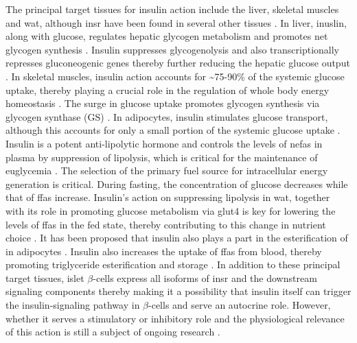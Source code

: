 
The principal target tissues for insulin action include the liver, skeletal muscles and \gls{wat}, although \gls{insr} have been found in several other tissues \textbf{\cite{spencer_identification_2018}}. In liver, inuslin, along with glucose, regulates hepatic glycogen metabolism and promotes net glycogen synthesis \textbf{\cite{petersen_mechanisms_2018,rossetti_relative_1990,roden_roles_1996}}. Insulin suppresses glycogenolysis and also transcriptionally represses gluconeogenic genes thereby further reducing the hepatic glucose output \textbf{\cite{petersen_mechanisms_2018,claus_regulation_1976,cherrington_direct_1998,edgerton_insulins_2006}}. In skeletal muscles, insulin action accounts for \textasciitilde75-90\% of the systemic glucose uptake, thereby playing a crucial role in the regulation of whole body energy homeostasis \textbf{\cite{leto_regulation_2012,petersen_mechanisms_2018}}. The surge in glucose uptake promotes glycogen synthesis via glycogen synthase (GS) \textbf{\cite{sylow_many_2021}}. In adipocytes, insulin stimulates glucose transport, although this accounts for only a small portion of the systemic glucose uptake \textbf{\cite{leto_regulation_2012}}. Insulin is a potent anti-lipolytic hormone and controls the levels of \glspl{nefa} in plasma by suppression of lipolysis, which is critical for the maintenance of euglycemia \textbf{\cite{dimitriadis_glucose_2006}}. The selection of the primary fuel source for intracellular energy generation is critical. During fasting, the concentration of glucose decreases while that of \glspl{ffa} increase. Insulin's action on suppressing lipolysis in \gls{wat}, together with its role in promoting glucose metabolism via \gls{glut}4 is key for lowering the levels of \glspl{ffa} in the fed state, thereby contributing to this change in nutrient choice \textbf{\cite{hummel_free_2021}}. It has been proposed that insulin also plays a part in the esterification of  in adipocytes \textbf{\cite{lewis_disordered_2002}}. Insulin also increases the uptake of \glspl{ffa} from blood, thereby promoting triglyceride esterification and storage \textbf{\cite{czech_insulin_2013}}. %
In addition to these principal target tissues, islet $\beta$-cells express all isoforms of \gls{insr} and the downstream signaling components thereby making it a possibility that insulin itself can trigger the insulin-signaling pathway in $\beta$-cells and serve an autocrine role. However, whether it serves a stimulatory or inhibitory role and the physiological relevance of this action is still a subject of ongoing research \textbf{\cite{rhodes_direct_2013,rachdaoui_insulin_2020}}.\\

